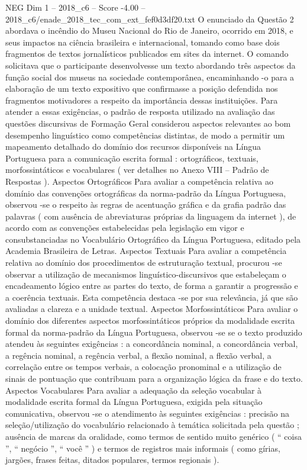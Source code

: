 \begin{textsample}{NEG Dim 1 – 2018\_c6 – Score -4.00 – 2018\_c6/enade\_2018\_tec\_com\_ext\_fef0d3df20.txt}
O enunciado da Questão 2 abordava o incêndio do Museu Nacional do Rio de Janeiro, ocorrido em 2018, e seus impactos na ciência brasileira e internacional, tomando como base dois fragmentos de textos jornalísticos publicados em sites da internet.
O comando solicitava que o participante desenvolvesse um texto abordando três aspectos da função social dos museus na sociedade contemporânea, encaminhando -o para a elaboração de um texto expositivo que confirmasse a posição defendida nos fragmentos motivadores a respeito da importância dessas instituições.
Para atender a essas exigências, o padrão de resposta utilizado na avaliação das questões discursivas de Formação Geral considerou aspectos relevantes ao bom desempenho linguístico como competências distintas, de modo a permitir um mapeamento detalhado do domínio dos recursos disponíveis na Língua Portuguesa para a comunicação escrita formal : ortográficos, textuais, morfossintáticos e vocabulares ( ver detalhes no Anexo VIII – Padrão de Respostas ).
Aspectos Ortográficos Para avaliar a competência relativa ao domínio das convenções ortográficas da norma-padrão da Língua Portuguesa, observou -se o respeito às regras de acentuação gráfica e da grafia padrão das palavras ( com ausência de abreviaturas próprias da linguagem da internet ), de acordo com as convenções estabelecidas pela legislação em vigor e consubstanciadas no Vocabulário Ortográfico da Língua Portuguesa, editado pela Academia Brasileira de Letras.
Aspectos Textuais Para avaliar a competência relativa ao domínio dos procedimentos de estruturação textual, procurou -se observar a utilização de mecanismos linguístico-discursivos que estabeleçam o encadeamento lógico entre as partes do texto, de forma a garantir a progressão e a coerência textuais.
Esta competência destaca -se por sua relevância, já que são avaliadas a clareza e a unidade textual.
Aspectos Morfossintáticos Para avaliar o domínio dos diferentes aspectos morfossintáticos próprios da modalidade escrita formal da norma-padrão da Língua Portuguesa, observou -se se o texto produzido atendeu às seguintes exigências : a concordância nominal, a concordância verbal, a regência nominal, a regência verbal, a flexão nominal, a flexão verbal, a correlação entre os tempos verbais, a colocação pronominal e a utilização de sinais de pontuação que contribuam para a organização lógica da frase e do texto.
Aspectos Vocabulares Para avaliar a adequação da seleção vocabular à modalidade escrita formal da Língua Portuguesa, exigida pela situação comunicativa, observou -se o atendimento às seguintes exigências : precisão na seleção/utilização do vocabulário relacionado à temática solicitada pela questão ; ausência de marcas da oralidade, como termos de sentido muito genérico ( “ coisa ”, “ negócio ”, “ você ” ) e termos de registros mais informais ( como gírias, jargões, frases feitas, ditados populares, termos regionais ).

\end{textsample}
